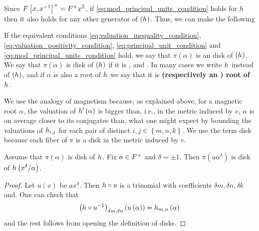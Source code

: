 \documentclass[../main.tex]{subfiles}
\begin{document}
  Since $F\left[ x, x^{-1} \right]^\times = F^\times x^{\mathbb{Z}}$, if \cref{eq:mod_principal_units_condition} holds for $h{}$ then it also holds for any other generator of $\left( h_{} \right)$.
  Thus, we can make the following
  \begin{definition}
    If the equivalent conditions \cref{eq:valuation_inequality_condition}, \cref{eq:valuation_positivity_condition}, \cref{eq:principal_unit_condition} and \cref{eq:mod_principal_units_condition} hold, we say that $\pi\left( \alpha \right)$ is an \textbf{} disk of $\left( h_{} \right)$.
    We say that $\pi\left( \alpha \right)$ is \textbf{\anex} disk of $\left( h_{} \right)$
    if it is ,  and .
    In many cases we write $h_{}$ instead of $\left( h_{} \right)$, and if $\alpha$ is also a root of $h_{}$ we say that it is \textbf{\anex (respectively an ) root of $h_{}$}.
  \end{definition}
  We use the analogy of magnetism because, as explained above, for a magnetic root $\alpha$, the valuation of $h_{}'\left( \alpha \right)$ is bigger than, i.e., in the metric induced by $v$, $\alpha$ is on average closer to its conjugates than, what one might expect by bounding the valuations of $h_{i,j}$ for each pair of distinct $i,j \in \left\{ m,n,k \right\}$.
  We use the term disk because each fiber of $\pi$ is a disk in the metric induced by $v$. 

  \begin{lemma}
    \label{lem:scalability}
    Assume that $\pi\left( \alpha \right)$ is \anex disk of $h_{}$.
    Fix $a \in F^\times$ and $\delta =\pm 1$.
    Then $\pi\left( a\alpha^\delta \right)$ is \anex disk of $h_{}\left( x^\delta / \alpha \right)$.
  \end{lemma}
  \begin{proof}
    Let $u\left( x \right)$ be $a x^\delta $.
    Then $h_{} \circ u$ is a trinomial with coefficients $\delta m, \delta n, \delta k$ and.
    One can check that 
    \[
      \left( h_{} \circ u^{-1} \right)_{\delta m,\delta n}\left( u\left( \alpha \right) \right) = h_{m,n}\left( \alpha \right)
    \]
    and the rest follows from opening the definition of \ex disks.
  \end{proof}
\end{document}
